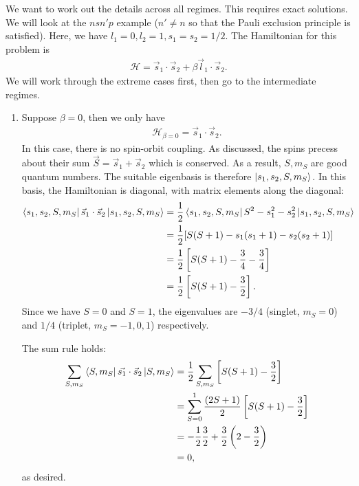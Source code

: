 \documentclass{article}
\theoremstyle{definition}
\newcommand{\ham}{\mathcal{H}}
\newcommand{\be}{\beta}
\newcommand{\f}[2]{\frac{#1}{#2}}
\newcommand{\lp}{\left(}
\newcommand{\rp}{\right)}
\newcommand{\lb}{\left[}
\newcommand{\rb}{\right]}
\begin{document}
We want to work out the details across all regimes. This requires exact solutions. We will look at the $nsn'p$ example ($n'\neq n$ so that the Pauli exclusion principle is satisfied). Here, we have $l_1 = 0, l_2 = 1, s_1 = s_2 = 1/2$.  The Hamiltonian for this problem is 
\begin{align*}
\ham = \vec{s}_1 \cdot \vec{s}_2 + \be \vec{l}_1 \cdot \vec{s}_2. 
\end{align*}
We will work through the extreme cases first, then go to the intermediate regimes. 


\begin{enumerate}[label=(\alph*)]
	\item Suppose $\be = 0$, then we only have
	\begin{align*}
	\ham_{\be = 0} = \vec{s}_1 \cdot \vec{s}_2. 
	\end{align*}
	In this case, there is no spin-orbit coupling. As discussed, the spins precess about their sum $\vec{S} = \vec{s}_1 + \vec{s}_2$ which is conserved. As a result, $S, m_S$ are good quantum numbers. The suitable eigenbasis is therefore $\ket{s_1,s_2,S,m_S}$. In this basis, the Hamiltonian is diagonal, with matrix elements along the diagonal:
	\begin{align*}
	\bra{s_1,s_2,S,m_S} \vec{s}_1 \cdot \vec{s}_2 \ket{s_1,s_2, S, m_S} 
	&= \f{1}{2}\bra{s_1,s_2,S,m_S} S^2 - s_1^2 - s_2^2 \ket{s_1,s_2, S, m_S} \\
	&= \f{1}{2} [S(S+1) - s_1(s_1+1) - s_2(s_2+1)]\\
	&= \f{1}{2}\lb S(S+1)- \f{3}{4} - \f{3}{4} \rb \\
	&= \f{1}{2}\lb S(S+1) - \f{3}{2} \rb.
	\end{align*} 
	Since we have $S=0$ and $S = 1$, the eigenvalues are $-3/4$ (singlet, $m_S = 0$) and $1/4$ (triplet, $m_S = -1,0,1$) respectively. 
	
	
	
	The sum rule holds:
	\begin{align*}
	\sum_{S,m_S} \bra{S,m_S} \vec{s_1}\cdot \vec{s}_2 \ket{S,m_S} 
	&= \f{1}{2}\sum_{S,m_S} \lb S(S+1) - \f{3}{2} \rb \\
	&= \sum_{S = 0}^1\f{(2S+1)}{2}  \lb S(S+1) - \f{3}{2} \rb \\
	&= -\f{1}{2}   \f{3}{2}  + \f{3}{2}  \lp  2 - \f{3}{2} \rp\\
	&= 0,
	\end{align*}
	as desired. 
	
	
	

\end{enumerate}
\end{document}
